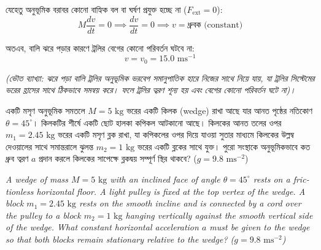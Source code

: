 \documentclass[12pt, a4paper]{article}
\begin{document}
{\begin{tcolorbox}[solutionbox={সমাধান (Solution)}]
যেহেতু অনুভূমিক বরাবর কোনো বাহ্যিক বল বা ঘর্ষণ প্রযুক্ত হচ্ছে না ($F_{\text{ext}} = 0$):
$$M \frac{dv}{dt} = 0 \implies \frac{dv}{dt} = 0 \implies v = \text{ধ্রুবক (constant)}$$

অতএব, বালি ঝরে পড়ার কারণে ট্রলির বেগের কোনো পরিবর্তন ঘটবে না:
$$v = v_0 = 15.0\text{ ms}^{-1}$$

\textit{(ভৌত ব্যাখ্যা: ঝরে পড়া বালি ট্রলির অনুভূমিক ভরবেগ সমানুপাতিক হারে নিজের সাথে নিয়ে যায়, যা ট্রলির সিস্টেমের ভরের হ্রাসের সাথে ঠিকভাবে সমন্বয় করে। ফলে ট্রলির ত্বরণ শূন্য হয় এবং বেগের কোনো পরিবর্তন ঘটে না)।}
\end{tcolorbox}
\vspace{1em}

\begin{tcolorbox}[questionbox={প্রশ্ন (Question) 34}]
\noindent
একটি মসৃণ অনুভূমিক সমতলে $M = 5\text{ kg}$ ভরের একটি কিলক (wedge) রাখা আছে যার আনত পৃষ্ঠের নতিকোণ $\theta = 45^\circ$। কিলকটির শীর্ষে একটি ছোট হালকা কপিকল আটকানো আছে। কিলকের আনত তলের ওপর $m_1 = 2.45\text{ kg}$ ভরের একটি মসৃণ ব্লক রাখা, যা কপিকলের ওপর দিয়ে যাওয়া সুতার মাধ্যমে কিলকের উল্লম্ব দেওয়ালের সাথে সমান্তরালে ঝুলন্ত $m_2 = 1\text{ kg}$ ভরের একটি ব্লকের সাথে যুক্ত। পুরো সংস্থাকে অনুভূমিকভাবে কত ধ্রুব ত্বরণ $a$ প্রদান করলে কিলকের সাপেক্ষে ব্লকদ্বয় সম্পূর্ণ স্থির থাকবে? ($g = 9.8\text{ ms}^{-2}$)

\vspace{0.8em}
\begin{english}
\noindent\textit{\color{darkgray}
A wedge of mass $M = 5\text{ kg}$ with an inclined face of angle $\theta = 45^\circ$ rests on a frictionless horizontal floor. A light pulley is fixed at the top vertex of the wedge. A block $m_1 = 2.45\text{ kg}$ rests on the smooth incline and is connected by a cord over the pulley to a block $m_2 = 1\text{ kg}$ hanging vertically against the smooth vertical side of the wedge. What constant horizontal acceleration $a$ must be given to the wedge so that both blocks remain stationary relative to the wedge? ($g = 9.8\text{ ms}^{-2}$)
}
\end{english}
\end{tcolorbox}

\vspace{1em}
\begin{center}
\end{center}}
\end{document}
